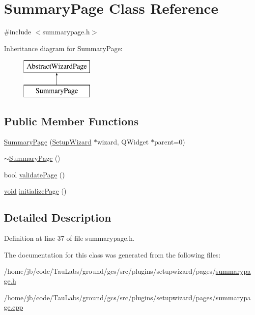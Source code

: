\hypertarget{class_summary_page}{\section{\-Summary\-Page \-Class \-Reference}
\label{class_summary_page}
}


{\ttfamily \#include $<$summarypage.\-h$>$}

\-Inheritance diagram for \-Summary\-Page\-:\begin{figure}[H]
\begin{center}
\leavevmode
\includegraphics[height=2.000000cm]{class_summary_page}
\end{center}
\end{figure}
\subsection*{\-Public \-Member \-Functions}
\begin{DoxyCompactItemize}
\item 
\hyperlink{group___summary_page_gac0ed5703bf2053761d8269cc674138ed}{\-Summary\-Page} (\hyperlink{class_setup_wizard}{\-Setup\-Wizard} $\ast$wizard, \-Q\-Widget $\ast$parent=0)
\item 
\hyperlink{group___summary_page_ga8c25c96270b9721692e6931ea63f42a2}{$\sim$\-Summary\-Page} ()
\item 
bool \hyperlink{group___summary_page_ga4ae44b0f8e7ea5786172b19103d9a1af}{validate\-Page} ()
\item 
\hyperlink{group___u_a_v_objects_plugin_ga444cf2ff3f0ecbe028adce838d373f5c}{void} \hyperlink{group___summary_page_ga78bc91ccb12e3cce67b078982da92ac0}{initialize\-Page} ()
\end{DoxyCompactItemize}


\subsection{\-Detailed \-Description}


\-Definition at line 37 of file summarypage.\-h.



\-The documentation for this class was generated from the following files\-:\begin{DoxyCompactItemize}
\item 
/home/jb/code/\-Tau\-Labs/ground/gcs/src/plugins/setupwizard/pages/\hyperlink{summarypage_8h}{summarypage.\-h}\item 
/home/jb/code/\-Tau\-Labs/ground/gcs/src/plugins/setupwizard/pages/\hyperlink{summarypage_8cpp}{summarypage.\-cpp}\end{DoxyCompactItemize}

